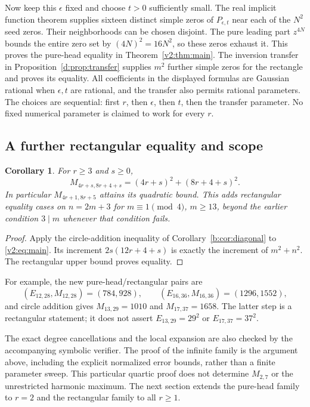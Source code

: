 \documentclass[UTF8,11pt]{ctexart}
\newtheorem{cor}[thm]{Corollary}
\theoremstyle{definition}
\numberwithin{equation}{section}
\begin{document}
Now keep this $\epsilon$ fixed and choose $t>0$ sufficiently small.
The real implicit function theorem supplies sixteen distinct simple
zeros of $P_{\epsilon,t}$ near each of the $N^2$ seed zeros.
Their neighborhoods can be chosen disjoint. The pure leading part
$z^{4N}$ bounds the entire zero set by $(4N)^2=16N^2$, so these zeros
exhaust it. This proves the pure-head equality in
Theorem~\ref{v2:thm:main}. The inversion transfer in
Proposition~\ref{d:prop:transfer} supplies $m^2$ further simple zeros
for the rectangle and proves its equality. All coefficients in the
displayed formulas are Gaussian rational when $\epsilon,t$ are rational,
and the transfer also permits rational parameters. The choices are
sequential: first $r$, then $\epsilon$, then $t$, then the transfer
parameter. No fixed numerical parameter is claimed to work for every $r$.

\subsection{A further rectangular equality and scope}

\begin{cor}\label{v2:cor:circle}
For $r\ge3$ and $s\ge0$,
\begin{equation}\label{v2:eq:circle}
 M_{4r+s,8r+4+s}=(4r+s)^2+(8r+4+s)^2.
\end{equation}
In particular $M_{4r+1,8r+5}$ attains its quadratic bound. This
adds rectangular equality cases on $n=2m+3$ for $m\equiv1\pmod4$,
$m\ge13$, beyond the earlier condition $3\mid m$ whenever that
condition fails.
\end{cor}
\begin{proof}
Apply the circle-addition inequality of
Corollary~\ref{b:cor:diagonal} to \eqref{v2:eq:main}.
Its increment $2s(12r+4+s)$ is exactly the increment of $m^2+n^2$.
The rectangular upper bound proves equality.
\end{proof}

For example, the new pure-head/rectangular pairs are
\[
 (E_{12,28},M_{12,28})=(784,928),\qquad
 (E_{16,36},M_{16,36})=(1296,1552),
\]
and circle addition gives $M_{13,29}=1010$ and $M_{17,37}=1658$.
The latter step is a rectangular statement; it does not assert
$E_{13,29}=29^2$ or $E_{17,37}=37^2$.

The exact degree cancellations and the local expansion are also
checked by the accompanying symbolic verifier. The proof of the
infinite family is the argument above, including the explicit normalized
error bounds, rather than a finite parameter sweep. This particular quartic proof does not determine $M_{2,7}$ or the
unrestricted harmonic maximum. The next section extends the pure-head
family to $r=2$ and the rectangular family to all $r\ge1$.
\end{document}
